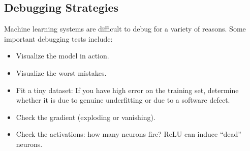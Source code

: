 \subsection{Debugging Strategies}
Machine learning systems are difficult to debug for a variety of reasons. Some important debugging tests include:
\begin{itemize}
    \item Visualize the model in action.
    \item Visualize the worst mistakes.
    \item Fit a tiny dataset: If you have high error on the training set, determine whether it is due to genuine underfitting or due to a software defect.
    \item Check the gradient (exploding or vanishing).
    \item Check the activations: how many neurons fire? ReLU can induce “dead” neurons.
\end{itemize}

